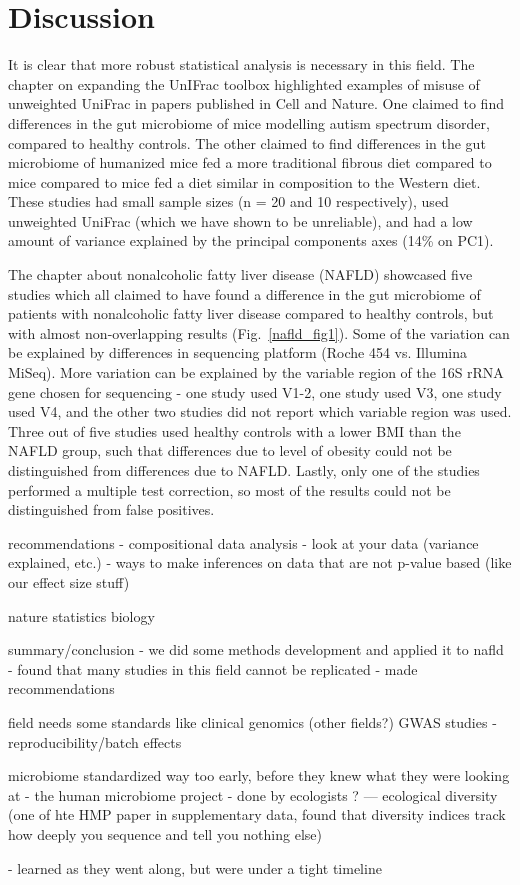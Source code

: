 \chapter{Discussion}

It is clear that more robust statistical analysis is necessary in this field. The chapter on expanding the UnIFrac toolbox highlighted examples of misuse of unweighted UniFrac in papers published in Cell and Nature. One claimed to find differences in the gut microbiome of mice modelling autism spectrum disorder, compared to healthy controls. The other claimed to find differences in the gut microbiome of humanized mice fed a more traditional fibrous diet compared to mice compared to mice fed a diet similar in composition to the Western diet. These studies had small sample sizes (n = 20 and 10 respectively), used unweighted UniFrac (which we have shown to be unreliable), and had a low amount of variance explained by the principal components axes (14\% on PC1).

The chapter about nonalcoholic fatty liver disease (NAFLD) showcased five studies which all claimed to have found a difference in the gut microbiome of patients with nonalcoholic fatty liver disease compared to healthy controls, but with almost non-overlapping results (Fig.~\ref{nafld_fig1}). Some of the variation can be explained by differences in sequencing platform (Roche 454 vs. Illumina MiSeq). More variation can be explained by the variable region of the 16S rRNA gene chosen for sequencing - one study used V1-2, one study used V3, one study used V4, and the other two studies did not report which variable region was used. Three out of five studies used healthy controls with a lower BMI than the NAFLD group, such that differences due to level of obesity could not be distinguished from differences due to NAFLD. Lastly, only one of the studies performed a multiple test correction, so most of the results could not be distinguished from false positives.

recommendations
- compositional data analysis
- look at your data (variance explained, etc.)
- ways to make inferences on data that are not p-value based (like our effect size stuff)

nature statistics biology

summary/conclusion
- we did some methods development and applied it to nafld
- found that many studies in this field cannot be replicated
- made recommendations

field needs some standards like clinical genomics (other fields?)
GWAS studies - reproducibility/batch effects

microbiome standardized way too early, before they knew what they were looking at
- the human microbiome project
- done by ecologists ?
 — ecological diversity (one of hte HMP paper in supplementary data, found that diversity indices track how deeply you sequence and tell you nothing else)

- learned as they went along, but were under a tight timeline